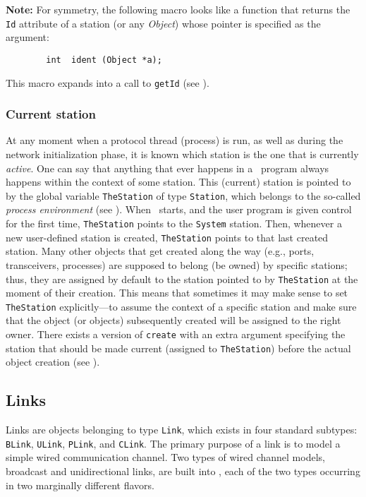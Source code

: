 \medskip

\noindent
{\bf Note:} For symmetry, the following macro looks like a function
that returns the {\tt Id} attribute
of a station (or any {\em Object\/}) whose pointer is specified as the
argument:
\begin{verbatim}
        int  ident (Object *a);
\end{verbatim}
This macro expands into a call to {\tt getId} (see ).

\subsubsection{Current station}
\label{rm_to_st_cu}

At any moment when a protocol thread (process) is run,
as well as during the network initialization phase,
it is known which station is the one that is currently {\em active}.
One can say that anything that ever happens in a \smurph\ program
always happens within the context of some station.
This (current) station is pointed to by the global variable {\tt TheStation}
of type {\tt Station}, which belongs to the so-called
{\em process environment\/} (see ).
When \smurph\ starts, and the user program is given control for the first time,
{\tt TheStation} points to the {\tt System} station.
Then, whenever a new user-defined station is created,
{\tt TheStation} points to that last created station.
Many other objects that get created along the way (e.g.,
ports, transceivers, processes) are supposed to belong (be owned) by
specific stations; thus, they are assigned by default to the station pointed
to by {\tt TheStation} at the moment of their creation.
This means that sometimes it may
make sense to set {\tt TheStation} explicitly---to
assume the context of a specific station and make sure that the object
(or objects) subsequently created will be assigned to the right owner.
There exists a version of {\tt create} with an extra argument specifying the
station that should be made current (assigned to {\tt TheStation})
before the actual object creation (see ).

\subsection{Links}
\label{rm_to_li}

Links are objects belonging to type {\tt Link}, which exists in four standard
subtypes: {\tt BLink}, {\tt ULink}, {\tt PLink}, and {\tt CLink}.
The primary purpose of a link is to model a simple wired
communication channel.
Two types of wired channel models, broadcast and unidirectional links,
are built into \smurph, each of the two types occurring in two marginally
different flavors.

